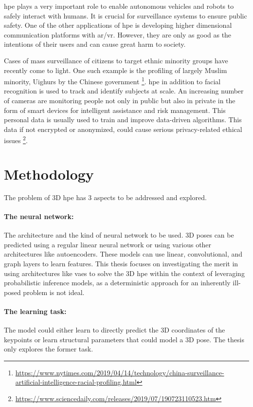\ac{hpe} plays a very important role to enable autonomous vehicles and robots to safely interact with humans. It is crucial for surveillance systems to ensure public safety. One of the other applications of \ac{hpe} is developing higher dimensional communication platforms with \ac{ar/vr}. However, they are only as good as the intentions of their users and can cause great harm to society. 

Cases of mass surveillance of citizens to target ethnic minority groups have recently come to light. One such example is the profiling of largely Muslim minority, Uighurs by the Chinese government \footnote{\url{https://www.nytimes.com/2019/04/14/technology/china-surveillance-artificial-intelligence-racial-profiling.html}}. \ac{hpe} in addition to facial recognition is used to track and identify subjects at scale. An increasing number of cameras are monitoring people not only in public but also in private in the form of smart devices for intelligent assistance and risk management. This personal data is usually used to train and improve data-driven algorithms. This data if not encrypted or anonymized, could cause serious privacy-related ethical issues \footnote{\url{https://www.sciencedaily.com/releases/2019/07/190723110523.htm}}.

\section{Methodology}
\label{sec:methodology}
The problem of 3D \ac{hpe} has 3 aspects to be addressed and explored.

\paragraph{The neural network:} The architecture and the kind of neural network to be used. 3D poses can be predicted using a regular linear neural network or using various other architectures like autoencoders. These models can use linear, convolutional, and graph layers to learn features. This thesis focuses on investigating the merit in using architectures like \acp{vae} to solve the 3D \ac{hpe} within the context of leveraging probabilistic inference models, as a deterministic approach for an inherently ill-posed problem is not ideal.

\paragraph{The learning task:} The model could either learn to directly predict the 3D coordinates of the keypoints or learn structural parameters that could model a 3D pose. The thesis only explores the former task.

